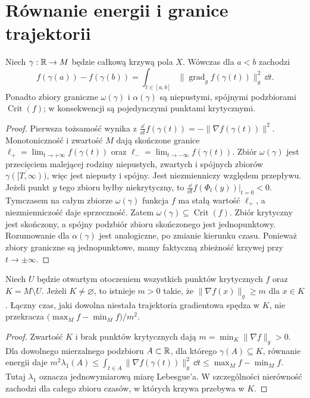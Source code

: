 \section{Równanie energii i granice trajektorii}
\begin{lemat}
\label{lem:morse-energy-analytic-v11}
Niech $\gamma:\mathbb{R}\to M$ będzie całkową krzywą pola $X$.
Wówczas dla $a<b$ zachodzi
\[
 f(\gamma(a))-f(\gamma(b))=
 \int_{t\in[a,b]}\|\operatorname{grad}_g f(\gamma(t))\|_g^2\,\dd t.
\]
Ponadto zbiory graniczne $\omega(\gamma)$ i $\alpha(\gamma)$ są
niepustymi, spójnymi podzbiorami $\operatorname{Crit}(f)$;
w konsekwencji są pojedynczymi punktami krytycznymi.
\end{lemat}
\begin{proof}
Pierwsza tożsamość wynika z
$\tfrac{\dd}{\dd t}f(\gamma(t))=-\|\nabla f(\gamma(t))\|^2$.
Monotoniczność i zwartość $M$ dają skończone granice
$\ell_+=\lim_{t\to+\infty}f(\gamma(t))$ oraz
$\ell_-=\lim_{t\to-\infty}f(\gamma(t))$.
Zbiór $\omega(\gamma)$ jest przecięciem malejącej rodziny
niepustych, zwartych i spójnych zbiorów
$\overline{\gamma([T,\infty))}$, więc jest niepusty i spójny.
Jest niezmienniczy względem przepływu. Jeżeli punkt $y$ tego
zbioru byłby niekrytyczny, to
$\tfrac{\dd}{\dd t}f(\Phi_t(y))|_{t=0}<0$.
Tymczasem na całym zbiorze $\omega(\gamma)$ funkcja $f$
ma stałą wartość $\ell_+$, a niezmienniczość daje sprzeczność.
Zatem $\omega(\gamma)\subseteq\operatorname{Crit}(f)$.
Zbiór krytyczny jest skończony, a spójny podzbiór zbioru
skończonego jest jednopunktowy. Rozumowanie dla $\alpha(\gamma)$
jest analogiczne, po zmianie kierunku czasu. Ponieważ zbiory
graniczne są jednopunktowe, mamy faktyczną zbieżność krzywej
przy $t\to\pm\infty$.
\end{proof}

\begin{lemat}
\label{lem:morse-transit-v11}
Niech $U$ będzie otwartym otoczeniem wszystkich punktów
krytycznych $f$ oraz $K=M\setminus U$.
Jeżeli $K\ne\varnothing$, to istnieje $m>0$ takie, że
$\|\nabla f(x)\|_g\ge m$ dla $x\in K$.
Łączny czas, jaki dowolna niestała trajektoria gradientowa
spędza w $K$, nie przekracza
$\bigl(\max_M f-\min_M f\bigr)/m^2$.
\end{lemat}
\begin{proof}
Zwartość $K$ i brak punktów krytycznych dają
$m=\min_K\|\nabla f\|_g>0$.
Dla dowolnego mierzalnego podzbioru $A\subset\mathbb{R}$, dla którego
$\gamma(A)\subseteq K$, równanie energii daje
$m^2\lambda_1(A)\le\int_{t\in A}\|\nabla f(\gamma(t))\|_g^2\,\dd t
\le\max_Mf-\min_Mf$.
Tutaj $\lambda_1$ oznacza jednowymiarową miarę Lebesgue'a.
W szczególności nierówność zachodzi dla całego zbioru czasów,
w których krzywa przebywa w $K$.
\end{proof}

